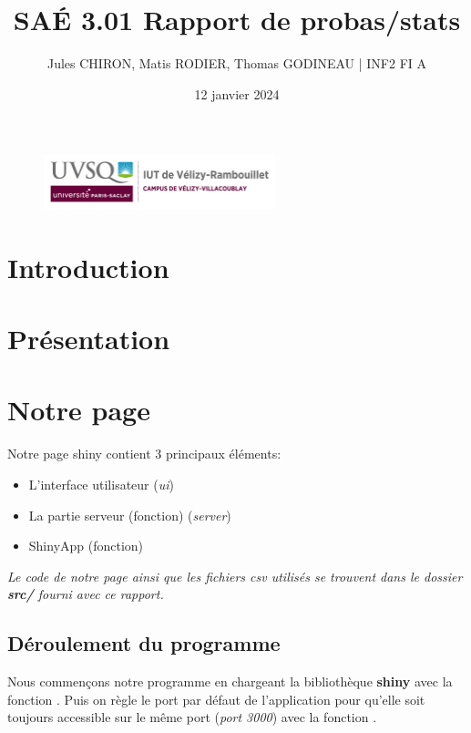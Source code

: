 \documentclass[12pt, a4paper]{article}
\title{SAÉ 3.01 Rapport de probas/stats}
\author{Jules CHIRON, Matis RODIER, Thomas GODINEAU | INF2 FI A}
\date{12 janvier 2024}
\begin{document}
\maketitle

\begin{figure}[h]
    \includegraphics[width=0.6\textwidth]{../annexes/logo_uvsq}
\end{figure}

\tableofcontents{}

\section*{Introduction}

\section{Présentation}

\section{Notre page}

Notre page shiny contient 3 principaux éléments:
\begin{itemize}
    \item L'interface utilisateur (\textit{ui})
    \item La partie serveur (fonction) (\textit{server})
    \item ShinyApp (fonction)
\end{itemize}
\bigskip
\textit{Le code de notre page ainsi que les fichiers csv utilisés se trouvent dans le dossier \textbf{src/} fourni avec ce rapport.}

\subsection*{Déroulement du programme}
\label{subsec:deroulement}

Nous commençons notre programme en chargeant la bibliothèque \textbf{shiny} avec la fonction .
Puis on règle le port par défaut de l'application pour qu'elle soit toujours accessible sur le même port (\textit{port 3000})
avec la fonction .
\bigskip
\end{document}
